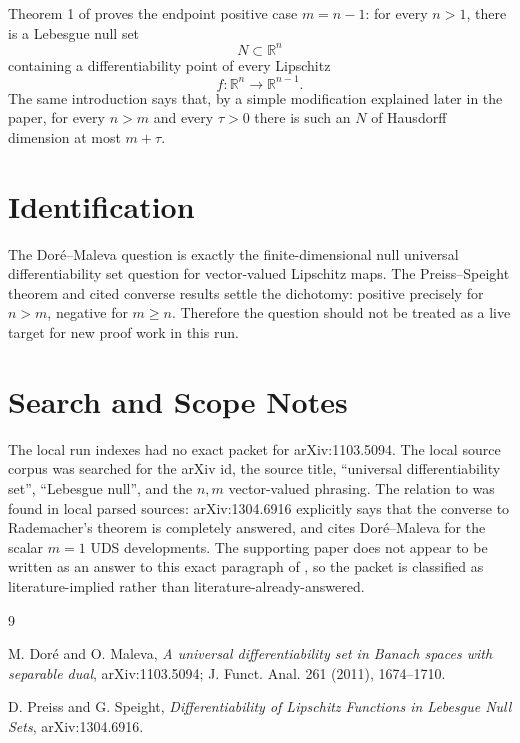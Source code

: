 \documentclass[11pt]{article}
\newcommand{\R}{\mathbb R}
\begin{document}
Theorem 1 of \cite{PS2014} proves the endpoint positive case \(m=n-1\):
for every \(n>1\), there is a Lebesgue null set
\[
  N\subset\R^n
\]
containing a differentiability point of every Lipschitz
\[
  f:\R^n\to\R^{n-1}.
\]
The same introduction says that, by a simple modification explained later in
the paper, for every \(n>m\) and every \(\tau>0\) there is such an \(N\) of
Hausdorff dimension at most \(m+\tau\).

\section*{Identification}

The Doré--Maleva question is exactly the finite-dimensional null universal
differentiability set question for vector-valued Lipschitz maps.  The
Preiss--Speight theorem and cited converse results settle the dichotomy:
positive precisely for \(n>m\), negative for \(m\ge n\).  Therefore the
question should not be treated as a live target for new proof work in this
run.

\section*{Search and Scope Notes}

The local run indexes had no exact packet for arXiv:1103.5094.  The local
source corpus was searched for the arXiv id, the source title, ``universal
differentiability set'', ``Lebesgue null'', and the \(n,m\) vector-valued
phrasing.  The relation to \cite{PS2014} was found in local parsed sources:
arXiv:1304.6916 explicitly says that the converse to Rademacher's theorem is
completely answered, and cites Doré--Maleva for the scalar \(m=1\) UDS
developments.  The supporting paper does not appear to be written as an
answer to this exact paragraph of \cite{DM2011}, so the packet is classified
as literature-implied rather than literature-already-answered.

\begin{thebibliography}{9}

M. Doré and O. Maleva,
\emph{A universal differentiability set in Banach spaces with separable dual},
arXiv:1103.5094; J. Funct. Anal. 261 (2011), 1674--1710.

D. Preiss and G. Speight,
\emph{Differentiability of Lipschitz Functions in Lebesgue Null Sets},
arXiv:1304.6916.

\end{thebibliography}
\end{document}

